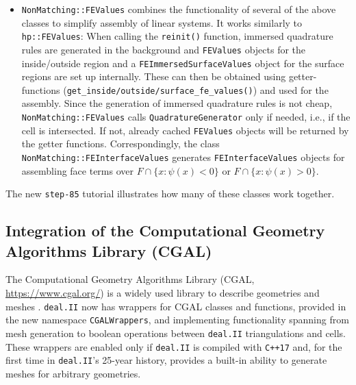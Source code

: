 \documentclass{ansarticle-preprint}
\newcommand{\specialword}[1]{\texttt{#1}}
\newcommand{\dealii}{{\specialword{deal.II}}\xspace}
\begin{document}
\begin{itemize}
  \item \texttt{NonMatching::FEValues} combines the functionality of
    several of the above classes to simplify assembly of linear systems. It works similarly to \texttt{hp::FEValues}:
  When calling the \texttt{reinit()} function, immersed quadrature rules are generated in the background and
  \texttt{FEValues} objects for the inside/outside region and a \texttt{FEImmersedSurfaceValues} object for the surface regions are set up internally. These can then be obtained using getter-functions (\texttt{get\_inside/outside/surface\_fe\_values()}) and used for the assembly.
  Since the generation of immersed quadrature rules is not cheap,
  \texttt{NonMatching::FEValues} calls  \texttt{QuadratureGenerator} only if needed, i.e., if the cell is intersected. If not, already cached \texttt{FEValues} objects will be returned by the getter functions.
  Correspondingly, the class \texttt{NonMatching::FEInterfaceValues} generates
  \texttt{FEInterfaceValues} objects for assembling face terms over $F \cap \{x : \psi(x) < 0 \}$ or $F \cap \{x : \psi(x) > 0 \}$.
\end{itemize}
The new \texttt{step-85} tutorial illustrates how many of these classes work together.




\subsection{Integration of the Computational Geometry Algorithms
  Library (CGAL)}\label{sec:cgalwrappers}

The Computational Geometry Algorithms Library (CGAL, \url{https://www.cgal.org/}) is a widely used
library to describe geometries and meshes \cite{cgal}. \dealii{} now
has wrappers for CGAL classes and functions, provided in the new
namespace \texttt{CGALWrappers}, and implementing functionality
spanning from mesh generation to boolean operations between \dealii{}
triangulations and cells. These wrappers are enabled only if \dealii{}
is compiled with \texttt{C++17} and, for the first time in \dealii{}'s
25-year history, provides a built-in ability to generate meshes for
arbitrary geometries.
\end{document}
